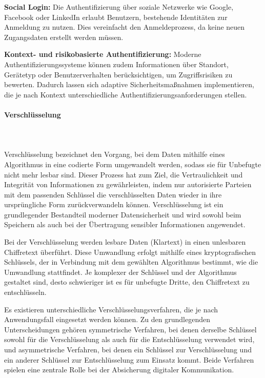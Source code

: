 \textbf{Social Login:}  
Die Authentifizierung über soziale Netzwerke wie Google, Facebook oder LinkedIn erlaubt Benutzern, bestehende Identitäten zur Anmeldung zu nutzen. Dies vereinfacht den Anmeldeprozess, da keine neuen Zugangsdaten erstellt werden müssen.\cite{it_schulungen_modern_auth}

\textbf{Kontext- und risikobasierte Authentifizierung:}  
Moderne Authentifizierungssysteme können zudem Informationen über Standort, Gerätetyp oder Benutzerverhalten berücksichtigen, um Zugriffsrisiken zu bewerten. Dadurch lassen sich adaptive Sicherheitsmaßnahmen implementieren, die je nach Kontext unterschiedliche Authentifizierungsanforderungen stellen.\cite{it_schulungen_modern_auth}


\paragraph{Verschlüsselung}
\mbox{}\\
\mbox{}\\
Verschlüsselung bezeichnet den Vorgang, bei dem Daten mithilfe eines Algorithmus in eine codierte Form umgewandelt werden, sodass sie für Unbefugte nicht mehr lesbar sind. Dieser Prozess hat zum Ziel, die Vertraulichkeit und Integrität von Informationen zu gewährleisten, indem nur autorisierte Parteien mit dem passenden Schlüssel die verschlüsselten Daten wieder in ihre ursprüngliche Form zurückverwandeln können. Verschlüsselung ist ein grundlegender Bestandteil moderner Datensicherheit und wird sowohl beim Speichern als auch bei der Übertragung sensibler Informationen angewendet.\cite{kaspersky_encryption}

Bei der Verschlüsselung werden lesbare Daten (Klartext) in einen unlesbaren Chiffretext überführt. Diese Umwandlung erfolgt mithilfe eines kryptografischen Schlüssels, der in Verbindung mit dem gewählten Algorithmus bestimmt, wie die Umwandlung stattfindet. Je komplexer der Schlüssel und der Algorithmus gestaltet sind, desto schwieriger ist es für unbefugte Dritte, den Chiffretext zu entschlüsseln.\cite{kaspersky_encryption}

Es existieren unterschiedliche Verschlüsselungsverfahren, die je nach Anwendungsfall eingesetzt werden können. Zu den grundlegenden Unterscheidungen gehören symmetrische Verfahren, bei denen derselbe Schlüssel sowohl für die Verschlüsselung als auch für die Entschlüsselung verwendet wird, und asymmetrische Verfahren, bei denen ein Schlüssel zur Verschlüsselung und ein anderer Schlüssel zur Entschlüsselung zum Einsatz kommt. Beide Verfahren spielen eine zentrale Rolle bei der Absicherung digitaler Kommunikation.\cite{kaspersky_encryption}

